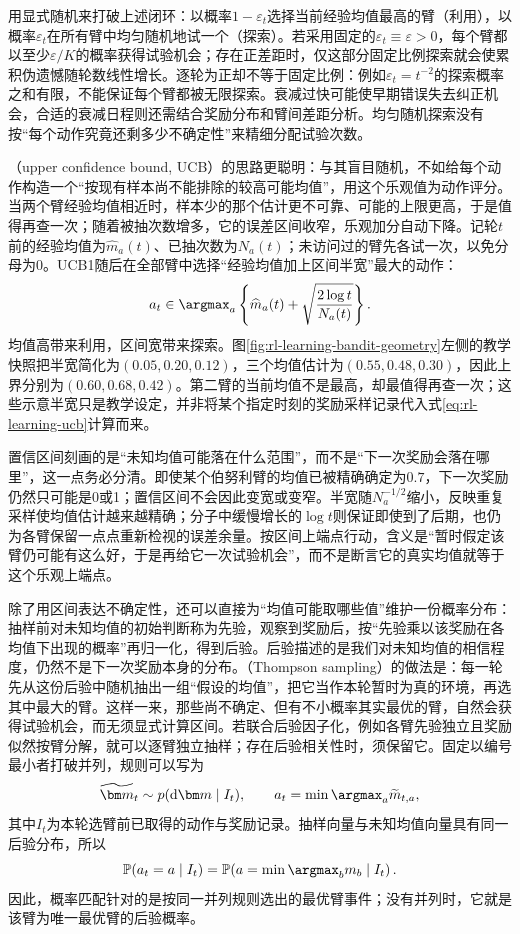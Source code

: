 用显式随机来打破上述闭环：以概率$1-\varepsilon_t$选择当前经验均值最高的臂（利用），以概率$\varepsilon_t$在所有臂中均匀随机地试一个（探索）。若采用固定的$\varepsilon_t\equiv\varepsilon>0$，每个臂都以至少$\varepsilon/K$的概率获得试验机会；存在正差距时，仅这部分固定比例探索就会使累积伪遗憾随轮数线性增长。逐轮为正却不等于固定比例：例如$\varepsilon_t=t^{-2}$的探索概率之和有限，不能保证每个臂都被无限探索。衰减过快可能使早期错误失去纠正机会，合适的衰减日程则还需结合奖励分布和臂间差距分析。均匀随机探索没有按“每个动作究竟还剩多少不确定性”来精细分配试验次数。

（upper confidence bound, UCB）的思路更聪明：与其盲目随机，不如给每个动作构造一个“按现有样本尚不能排除的较高可能均值”，用这个乐观值为动作评分。当两个臂经验均值相近时，样本少的那个估计更不可靠、可能的上限更高，于是值得再查一次；随着被抽次数增多，它的误差区间收窄，乐观加分自动下降。记轮$t$前的经验均值为$\widehat m_a(t)$、已抽次数为$N_a(t)$；未访问过的臂先各试一次，以免分母为0。UCB1随后在全部臂中选择“经验均值加上区间半宽”最大的动作：
\begin{equation}
  a_t\in\argmax_a\left\{\widehat m_a(t)
    +\sqrt{\frac{2\log t}{N_a(t)}}\right\}.
  \label{eq:rl-learning-ucb}
\end{equation}
均值高带来利用，区间宽带来探索。图\ref{fig:rl-learning-bandit-geometry}左侧的教学快照把半宽简化为$(0.05,0.20,0.12)$，三个均值估计为$(0.55,0.48,0.30)$，因此上界分别为$(0.60,0.68,0.42)$。第二臂的当前均值不是最高，却最值得再查一次；这些示意半宽只是教学设定，并非将某个指定时刻的奖励采样记录代入式\eqref{eq:rl-learning-ucb}计算而来。

置信区间刻画的是“未知均值可能落在什么范围”，而不是“下一次奖励会落在哪里”，这一点务必分清。即使某个伯努利臂的均值已被精确确定为$0.7$，下一次奖励仍然只可能是0或1；置信区间不会因此变宽或变窄。半宽随$N_a^{-1/2}$缩小，反映重复采样使均值估计越来越精确；分子中缓慢增长的$\log t$则保证即使到了后期，也仍为各臂保留一点点重新检视的误差余量。按区间上端点行动，含义是“暂时假定该臂仍可能有这么好，于是再给它一次试验机会”，而不是断言它的真实均值就等于这个乐观上端点。

除了用区间表达不确定性，还可以直接为“均值可能取哪些值”维护一份概率分布：抽样前对未知均值的初始判断称为先验，观察到奖励后，按“先验乘以该奖励在各均值下出现的概率”再归一化，得到后验。后验描述的是我们对未知均值的相信程度，仍然不是下一次奖励本身的分布。（Thompson sampling）的做法是：每一轮先从这份后验中随机抽出一组“假设的均值”，把它当作本轮暂时为真的环境，再选其中最大的臂。这样一来，那些尚不确定、但有不小概率其实最优的臂，自然会获得试验机会，而无须显式计算区间。若联合后验因子化，例如各臂先验独立且奖励似然按臂分解，就可以逐臂独立抽样；存在后验相关性时，须保留它。固定以编号最小者打破并列，规则可以写为
\[
  \widetilde{\bm m}_t\sim p(\mathrm d\bm m\mid I_t),
  \qquad a_t=\min\argmax_a\widetilde m_{t,a},
\]
其中$I_t$为本轮选臂前已取得的动作与奖励记录。抽样向量与未知均值向量具有同一后验分布，所以
\[
  \mathbb P(a_t=a\mid I_t)
   =\mathbb P\!\left(a=\min\argmax_b m_b\mid I_t\right).
\]
因此，概率匹配针对的是按同一并列规则选出的最优臂事件；没有并列时，它就是该臂为唯一最优臂的后验概率。

